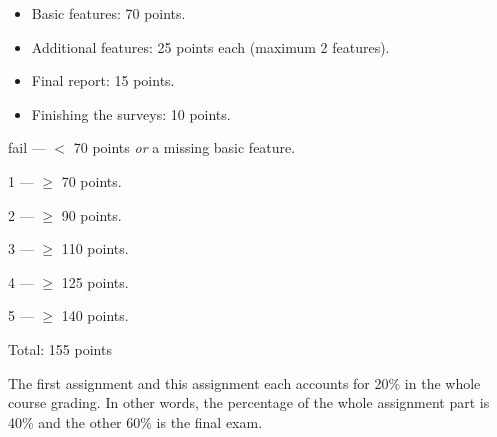 \documentclass[12pt, a4paper]{article}
\begin{document}
\begin{itemize}
\item Basic features: 70 points.
\item Additional features: 25 points each (maximum 2 features).
\item Final report: 15 points.
\item Finishing the surveys: 10 points.
\end{itemize}

fail --- $<$ 70 points \emph{or} a missing basic feature.

1 --- $\ge$ 70 points.

2 --- $\ge$ 90 points.

3 --- $\ge$ 110 points.

4 --- $\ge$ 125 points.

5 --- $\ge$ 140 points.

\vskip 20pt

Total: 155 points

\vskip 20pt

The first assignment and this assignment each accounts for 20\% in the whole course grading.
In other words, the percentage of the whole assignment part is 40\% and the other 60\% is the final exam.
\end{document}
